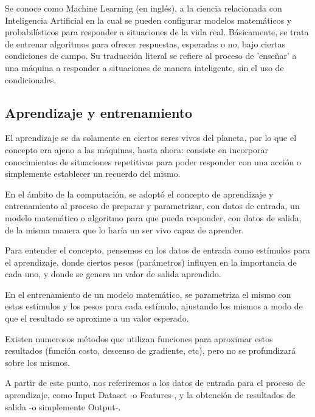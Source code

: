 \documentclass[a4paper,12pt,oneside,spanish]{book}
\begin{document}
Se conoce como Machine Learning (en inglés), a la ciencia relacionada con Inteligencia Artificial en la cual se pueden configurar modelos matemáticos y probabilísticos para responder a situaciones de la vida real. Básicamente, se trata de entrenar algoritmos para ofrecer respuestas, esperadas o no, bajo ciertas condiciones de campo. Su traducción literal se refiere al proceso de 'enseñar' a una máquina a responder a situaciones de manera inteligente, sin el uso de condicionales.\par
	
\subsection{Aprendizaje y entrenamiento}
El aprendizaje se da solamente en ciertos seres vivos del planeta, por lo que el concepto era ajeno a las máquinas, hasta ahora: consiste en incorporar conocimientos de situaciones repetitivas para poder responder con una acción o simplemente establecer un recuerdo del mismo.\par

En el ámbito de la computación, se adoptó el concepto de aprendizaje y entrenamiento al proceso de preparar y parametrizar, con datos de entrada, un modelo matemático o algoritmo para que pueda responder, con datos de salida, de la misma manera que lo haría un ser vivo capaz de aprender.\par

Para entender el concepto, pensemos en los datos de entrada como estímulos para el aprendizaje, donde ciertos pesos (parámetros) influyen en la importancia de cada uno, y donde se genera un valor de salida aprendido.\par

En el entrenamiento de un modelo matemático, se parametriza el mismo con estos estímulos y los pesos para cada estímulo, ajustando los mismos a modo de que el resultado se aproxime a un valor esperado.  \par

Existen numerosos métodos que utilizan funciones para aproximar estos resultados (función costo, descenso de gradiente, etc), pero no se profundizará sobre los mismos. \par

A partir de este punto, nos referiremos a los datos de entrada para el proceso de aprendizaje, como Input Dataset -o Features-, y la obtención de resultados de salida -o simplemente Output-.\par
\end{document}
